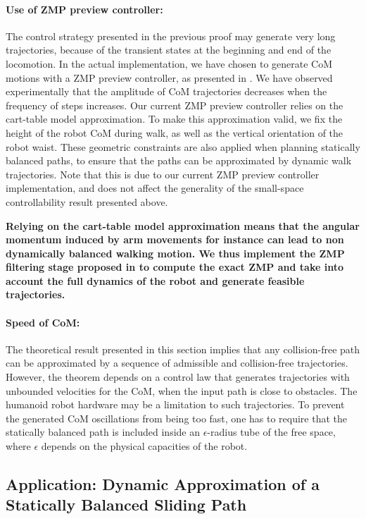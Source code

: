 \documentclass{article}
\begin{document}
\paragraph{Use of ZMP preview controller:} The control strategy presented in the  
previous proof may
generate very  long trajectories, because  of the transient  states at
the beginning and end of the locomotion. In the actual implementation,
we have chosen  to generate  CoM motions with  a ZMP preview  controller, as
presented in \cite{kajita2003biped}.  We  have observed experimentally that the
amplitude of  CoM trajectories decreases  when the frequency  of steps
increases. Our current ZMP preview controller relies on the cart-table model approximation.
To make this approximation valid, we fix the height of the robot CoM during walk,
as well as the vertical orientation of the robot waist. These geometric constraints 
are also applied when planning statically balanced paths, to ensure that the paths
can be approximated by dynamic walk trajectories. Note that this is
due to our current  ZMP preview controller implementation, and does not affect
the generality of the small-space controllability result presented above.

\textbf{Relying on the cart-table model approximation means that the
  angular momentum induced by arm movements for instance can lead to
  non dynamically balanced walking motion. We thus implement the ZMP
  filtering stage proposed in \cite{kajita2003biped} to compute the
  exact ZMP and take into account the full dynamics of the robot and
  generate feasible trajectories.}

\paragraph{Speed of CoM:} The theoretical result presented in this section implies
that any collision-free path can be approximated by a sequence of admissible 
and collision-free trajectories. However, the theorem depends on a control law
that generates trajectories with unbounded velocities for the CoM, when the input
path is close to obstacles. The humanoid robot
hardware may be a limitation to such trajectories. To prevent the generated CoM 
oscillations from being too fast, one has to require that the statically balanced 
path is included
inside an $\epsilon$-radius tube of the free space, where $\epsilon$ depends on the
physical capacities of the robot.




\subsection{Application: Dynamic Approximation of a Statically Balanced Sliding Path}
\label{sec:ssc-application}
\end{document}
